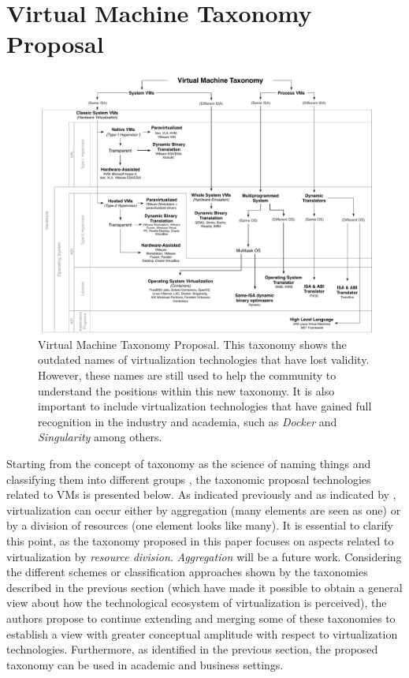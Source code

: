 	\section {Virtual Machine Taxonomy Proposal} \label{sec:taxonomiaPropuesta}
	
	\begin{figure}[ht]
		\centering
		\includegraphics[width=17cm]{images/virtualMachineTaxonomy.pdf}
		\vspace{-0.2cm}%
		\caption{Virtual Machine Taxonomy Proposal. This taxonomy shows the outdated names of virtualization technologies that have lost validity. However, these names are still used to help the community to understand the positions within this new taxonomy. It is also important to include virtualization technologies that have gained full recognition in the industry and academia, such as \textit{Docker} and \textit{Singularity} among others. }
    	\label{fig:TaxonomiaPropuesta}
	\end{figure}
	
	Starting from the concept of taxonomy as the science of naming things and classifying them into different groups \cite{CambridgeDictionary2018, Chi2000}, the taxonomic proposal technologies related to VMs is presented below. As indicated previously and as indicated by \cite{Chiueh2005, Hoopes2009}, virtualization can occur either by aggregation (many elements are seen as one) or by a division of resources (one element looks like many). It is essential to clarify this point, as the taxonomy proposed in this paper focuses on aspects related to virtualization by \textit{resource division}. \textit{Aggregation} will be a future work. Considering the different schemes or classification approaches shown by the taxonomies described in the previous section (which have made it possible to obtain a general view about how the technological ecosystem of virtualization is perceived), the authors propose to continue extending and merging some of these taxonomies to establish a view with greater conceptual amplitude with respect to virtualization technologies. Furthermore, as identified in the previous section, the proposed taxonomy can be used in academic and business settings.
	
